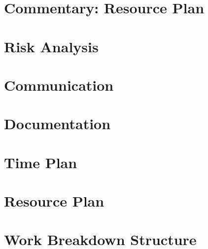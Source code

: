 \documentclass[11pt, titlepage]{article} %
\begin{document}
\section{Commentary: Resource Plan}
\section{Risk Analysis}
\section{Communication}
\section{Documentation}

\clearpage



\clearpage
\appendix
\section{Time Plan}
\section{Resource Plan}
\section{Work Breakdown Structure}
\end{document}

